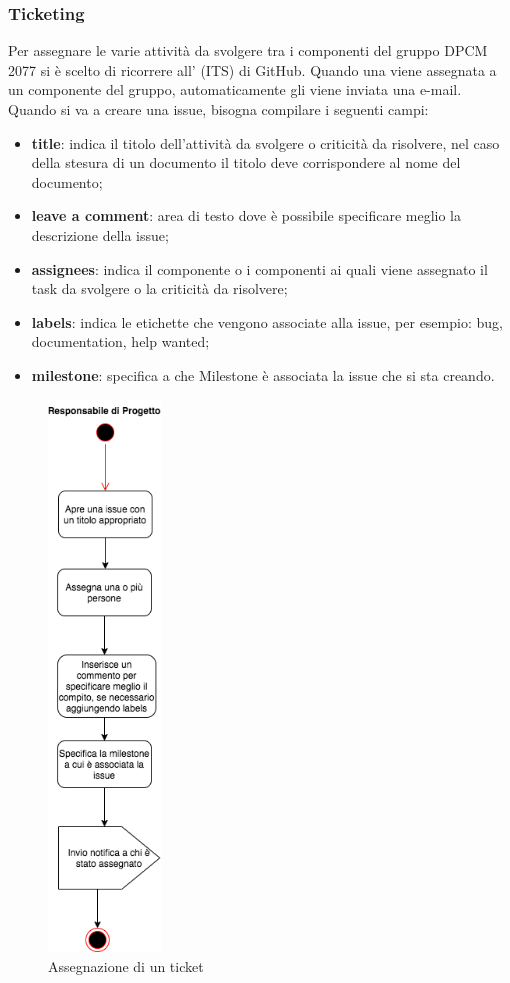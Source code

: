 \subsubsection{Ticketing}
Per assegnare le varie attività da svolgere tra i componenti del gruppo DPCM 2077 si è scelto di ricorrere all' (ITS) di GitHub.
Quando una  viene assegnata a un componente del gruppo, automaticamente gli viene inviata una e-mail.
Quando si va a creare una issue, bisogna compilare i seguenti campi:
\begin{itemize}
\item{\textbf{title}: indica il titolo dell'attività da svolgere o criticità da risolvere, nel caso della stesura di un documento il titolo deve corrispondere al nome del documento;}
\item{\textbf{leave a comment}: area di testo dove è possibile specificare meglio la descrizione della issue;}
\item{\textbf{assignees}: indica il componente o i componenti ai quali viene assegnato il task da svolgere o la criticità da risolvere;}
\item{\textbf{labels}: indica le etichette che vengono associate alla issue, per esempio: bug, documentation, help wanted;}
\item{\textbf{milestone}: specifica a che Milestone è associata la issue che si sta creando.}
\end{itemize} 
\begin{figure}[H]
	\centering
	\includegraphics[width=3cm]{res/images/ticket.png}
	\caption{Assegnazione di un ticket}
	\label{fig:Assegnazione di un ticket}
\end{figure}

